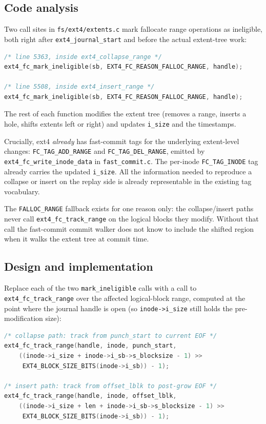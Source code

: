 \documentclass[12pt,a4paper]{article}
\begin{document}
\subsection{Code analysis}

Two call sites in \texttt{fs/ext4/extents.c} mark fallocate
range operations as ineligible, both right after
\texttt{ext4\_journal\_start} and before the actual extent-tree
work:

\begin{lstlisting}[language=C]
/* line 5363, inside ext4_collapse_range */
ext4_fc_mark_ineligible(sb, EXT4_FC_REASON_FALLOC_RANGE, handle);

/* line 5508, inside ext4_insert_range */
ext4_fc_mark_ineligible(sb, EXT4_FC_REASON_FALLOC_RANGE, handle);
\end{lstlisting}

The rest of each function modifies the extent tree (removes a
range, inserts a hole, shifts extents left or right) and updates
\texttt{i\_size} and the timestamps.

Crucially, ext4 \emph{already} has fast-commit tags for the
underlying extent-level changes: \texttt{FC\_TAG\_ADD\_RANGE}
and \texttt{FC\_TAG\_DEL\_RANGE}, emitted by
\texttt{ext4\_fc\_write\_inode\_data} in \texttt{fast\_commit.c}.
The per-inode \texttt{FC\_TAG\_INODE} tag already carries the
updated \texttt{i\_size}.  All the information needed to reproduce
a collapse or insert on the replay side is already representable
in the existing tag vocabulary.

The \texttt{FALLOC\_RANGE} fallback exists for one reason only:
the collapse/insert paths never call \texttt{ext4\_fc\_track\_range}
on the logical blocks they modify.  Without that call the
fast-commit commit walker does not know to include the shifted
region when it walks the extent tree at commit time.

\subsection{Design and implementation}

Replace each of the two \texttt{mark\_ineligible} calls with a
call to \texttt{ext4\_fc\_track\_range} over the affected
logical-block range, computed at the point where the journal
handle is open (so \texttt{inode->i\_size} still holds the
pre-modification size):

\begin{lstlisting}[language=C]
/* collapse path: track from punch_start to current EOF */
ext4_fc_track_range(handle, inode, punch_start,
    ((inode->i_size + inode->i_sb->s_blocksize - 1) >>
     EXT4_BLOCK_SIZE_BITS(inode->i_sb)) - 1);

/* insert path: track from offset_lblk to post-grow EOF */
ext4_fc_track_range(handle, inode, offset_lblk,
    ((inode->i_size + len + inode->i_sb->s_blocksize - 1) >>
     EXT4_BLOCK_SIZE_BITS(inode->i_sb)) - 1);
\end{lstlisting}
\end{document}
